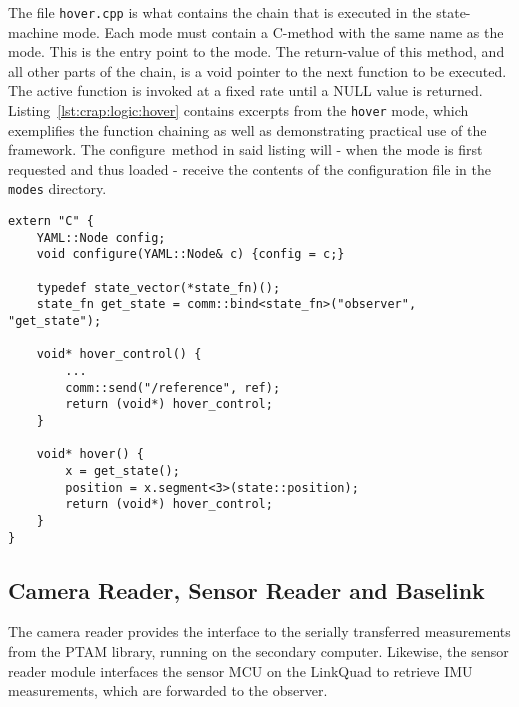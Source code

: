 \begin{minipage}{\textwidth}
\end{minipage}

        The file \texttt{hover.cpp} is what contains the chain that is executed
        in the state-machine mode. Each mode must contain a C-method with the
        same name as the mode. This is the entry point to the mode.
        The return-value of this method, and all other parts of the chain,
        is a void pointer to the next function to be executed.
        The active function is invoked at a fixed rate until a NULL value is
        returned. Listing~\ref{lst:crap:logic:hover} contains
        excerpts from the \texttt{hover} mode, which exemplifies the function
        chaining as well as demonstrating practical use of the \crap framework.
        The configure~method in said listing will - when the mode is first
        requested and thus loaded - receive the contents of the configuration
        file in the \texttt{modes} directory.
        \begin{minipage}{\textwidth}
        \begin{lstlisting}
extern "C" {
    YAML::Node config;
    void configure(YAML::Node& c) {config = c;}

    typedef state_vector(*state_fn)();
    state_fn get_state = comm::bind<state_fn>("observer", "get_state");

    void* hover_control() {
        ...
        comm::send("/reference", ref);
        return (void*) hover_control;
    }

    void* hover() {
        x = get_state();
        position = x.segment<3>(state::position);
        return (void*) hover_control;
    }
}
        \end{lstlisting}
        \end{minipage}

        \subsection{Camera Reader, Sensor Reader and Baselink}
            The camera reader provides the interface to the serially transferred
            measurements from the PTAM library, running on the secondary computer.
            Likewise, the sensor reader module interfaces the sensor MCU on the LinkQuad
            to retrieve IMU measurements, which are forwarded to the observer.

